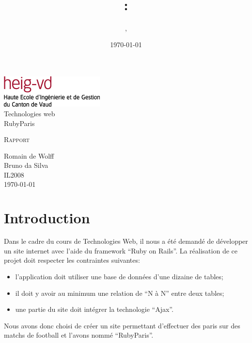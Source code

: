 \documentclass[10pt,a4paper,titlepage]{article}
\author{\auteurOne, \auteurTwo}
\title{\branchetag : \laboname}
\date{\today}
\newcommand{\branche}{Technologies web}
\newcommand{\laboname}{RubyParis}
\newcommand{\auteurOne}{Romain de Wolff}
\newcommand{\auteurTwo}{Bruno da Silva}
\newcommand{\promo}{IL2008}
\begin{document}
\pagestyle{headings}
\begin{titlepage}
	\begin{center}
	\includegraphics{imgs/logo-HEIG-VD.jpg}\\
		\vspace{3cm}
		\LARGE \branche %
		\vspace{3cm}\\
		\Huge \laboname \\
		\vspace{3cm}

		\Large \textsc{Rapport} \\
		\vspace{3cm}

		\large \auteurOne \\
		\auteurTwo \\	
		\vspace{10pt}
		\normalsize \textsc{\promo} \\

		\vspace{2cm}
		\today
	\end{center}
\end{titlepage}

\tableofcontents
\newpage
\pagestyle{fancy}

\section{Introduction}
Dans le cadre du cours de Technologies Web, il nous a été demandé de développer un site internet avec l'aide du framework “Ruby on Rails”. La réalisation de ce projet doit respecter les contraintes suivantes:
\begin{itemize}
	\item {l'application doit utiliser une base de données d'une dizaine de tables;}
	\item {il doit y avoir au minimum une relation de “N à N” entre deux tables;}
	\item {une partie du site doit intégrer la technologie “Ajax”.\\}
\end{itemize}

Nous avons donc choisi de créer un site permettant d'effectuer des paris sur des matchs de football et l'avons nommé “RubyParis”.
\end{document}
